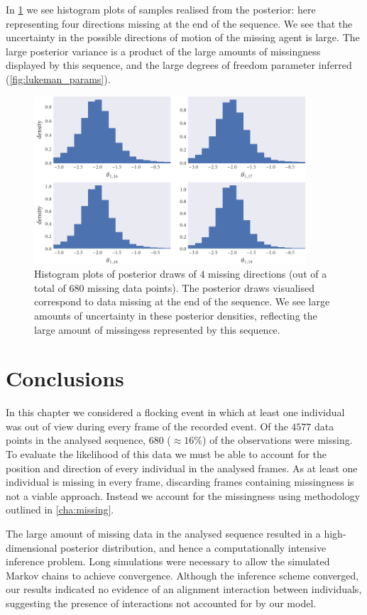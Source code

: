In \cref{fig:dir_hist} we see histogram plots of samples realised
from the posterior: here representing four directions missing at the end of the
sequence. We see that the uncertainty in the possible directions of motion
of the missing agent is large. The large posterior variance is a product of the
large amounts of missingness displayed by this sequence, and the large degrees
of freedom parameter inferred (\cref{fig:lukeman_params}).

\begin{figure}[tb]
  \includegraphics[width=0.9\textwidth]{dir_hist.pdf}
  \caption{Histogram plots of posterior draws of $4$ missing directions (out of
    a total of $680$ missing data points). The posterior draws visualised
    correspond to data missing at the end of the sequence. We see large amounts
    of uncertainty in these posterior densities, reflecting the large amount of
    missingess represented by this sequence.}
  \label{fig:dir_hist}
\end{figure}

\section*{Conclusions}

In this chapter we considered a flocking event in which at least one individual
was out of view during every frame of the recorded event. Of the $4577$ data
points in the analysed sequence, $680$ ($\approx16\%$) of the observations were
missing. To evaluate the likelihood of this data we must be able to account for
the position and direction of every individual in the analysed frames. As at
least one individual is missing in every frame, discarding frames containing
missingness is not a viable approach. Instead we account for the missingness
using methodology outlined in \cref{cha:missing}.

The large amount of missing data in the analysed sequence resulted in a
high-dimensional posterior distribution, and hence a computationally intensive
inference problem. Long simulations were necessary to allow the simulated
Markov chains to achieve convergence. Although the inference scheme converged,
our results indicated no evidence of an alignment interaction between
individuals, suggesting the presence of interactions not accounted for by our
model.



